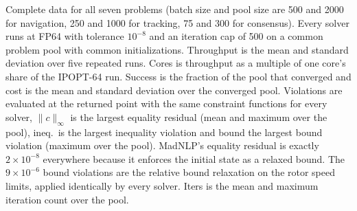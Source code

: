\begin{table}[p]
\caption{\scriptsize Complete data for all seven problems (batch size and pool size are 500 and 2000 for navigation, 250 and 1000 for tracking, 75 and 300 for consensus). Every solver runs at FP64 with tolerance $10^{-8}$ and an iteration cap of 500 on a common problem pool with common initializations. Throughput is the mean and standard deviation over five repeated runs. Cores is throughput as a multiple of one core's share of the IPOPT-64 run. Success is the fraction of the pool that converged and cost is the mean and standard deviation over the converged pool. Violations are evaluated at the returned point with the same constraint functions for every solver, $\lVert c\rVert_\infty$ is the largest equality residual (mean and maximum over the pool), ineq.\ is the largest inequality violation and bound the largest bound violation (maximum over the pool). MadNLP's equality residual is exactly $2\times10^{-8}$ everywhere because it enforces the initial state as a relaxed bound. The $9\times10^{-6}$ bound violations are the relative bound relaxation on the rotor speed limits, applied identically by every solver. Iters is the mean and maximum iteration count over the pool.}
\label{tab:full-data}
\end{table}
